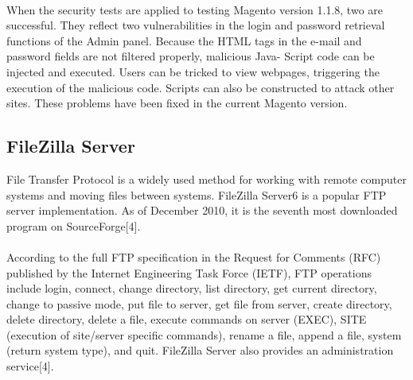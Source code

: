 \paragraph*{}
When the security tests are applied to testing Magento
version 1.1.8, two are successful. They reflect two vulnerabilities
in the login and password retrieval functions of the
Admin panel. Because the HTML tags in the e-mail and
password fields are not filtered properly, malicious Java-
Script code can be injected and executed. Users can be
tricked to view webpages, triggering the execution of the
malicious code. Scripts can also be constructed to attack
other sites. These problems have been fixed in the current
Magento version.
\subsection*{\large FileZilla Server}
File Transfer Protocol is a widely used method for working
with remote computer systems and moving files between
systems. FileZilla Server6 is a popular FTP server implementation.
As of December 2010, it is the seventh most
downloaded program on SourceForge[4].
\paragraph*{}
According to the full FTP specification in the Request for
Comments (RFC) published by the Internet Engineering
Task Force (IETF), FTP operations include login, connect,
change directory, list directory, get current directory,
change to passive mode, put file to server, get file from
server, create directory, delete directory, delete a file,
execute commands on server (EXEC), SITE (execution of
site/server specific commands), rename a file, append a file,
system (return system type), and quit. FileZilla Server also
provides an administration service[4].

